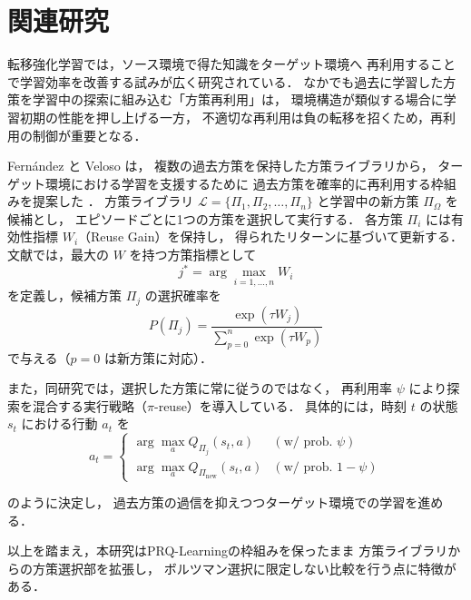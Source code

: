 \section{関連研究}
転移強化学習では，ソース環境で得た知識をターゲット環境へ
再利用することで学習効率を改善する試みが広く研究されている．
なかでも過去に学習した方策を学習中の探索に組み込む「方策再利用」は，
環境構造が類似する場合に学習初期の性能を押し上げる一方，
不適切な再利用は負の転移を招くため，再利用の制御が重要となる．

Fern\'andez と Veloso は，
複数の過去方策を保持した方策ライブラリから，
ターゲット環境における学習を支援するために
過去方策を確率的に再利用する枠組みを提案した 
\cite{Fernandez2006}．
方策ライブラリ $\mathcal{L}=\{\Pi_1,\Pi_2,\ldots,\Pi_n\}$ 
と学習中の新方策 $\Pi_{\Omega}$ を候補とし，
エピソードごとに1つの方策を選択して実行する．
各方策 $\Pi_i$ には有効性指標 $W_i$（Reuse Gain）を保持し，
得られたリターンに基づいて更新する．
文献\cite{Fernandez2006}では，最大の $W$ を持つ方策指標として
\begin{equation}
j^\ast = \arg\max_{i=1,\ldots,n} W_i
\tag{3}
\end{equation}
を定義し，候補方策 $\Pi_j$ の選択確率を
\begin{equation}
P(\Pi_j)=\frac{\exp(\tau W_j)}{\sum_{p=0}^{n}\exp(\tau W_p)}
\tag{4}
\end{equation}
で与える（$p=0$ は新方策に対応）．

また，同研究では，選択した方策に常に従うのではなく，
再利用率 $\psi$ により探索を混合する実行戦略（$\pi$-reuse）を導入している．
具体的には，時刻 $t$ の状態 $s_t$ における行動 $a_t$ を
\begin{equation}
a_t =
\begin{cases}
\displaystyle \arg\max_{a} Q_{\Pi_j}(s_t,a)
& (\text{w/ prob. } \psi)\\[3pt]
\displaystyle \arg\max_{a} Q_{\Pi_{\mathrm{new}}}(s_t,a)
& (\text{w/ prob. } 1-\psi)
\end{cases}
\tag{5}
\end{equation}

のように決定し，
過去方策の過信を抑えつつターゲット環境での学習を進める．

以上を踏まえ，本研究はPRQ-Learningの枠組みを保ったまま
方策ライブラリからの方策選択部を拡張し，
ボルツマン選択に限定しない比較を行う点に特徴がある．

